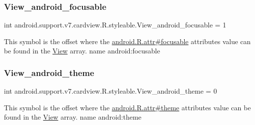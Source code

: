 \subsubsection{\texorpdfstring{View\+\_\+android\+\_\+focusable}{View\_android\_focusable}}
{\footnotesize\ttfamily int android.\+support.\+v7.\+cardview.\+R.\+styleable.\+View\+\_\+android\+\_\+focusable = 1\hspace{0.3cm}{\ttfamily [static]}}

This symbol is the offset where the \hyperlink{}{android.\+R.\+attr\#focusable} attribute\textquotesingle{}s value can be found in the \hyperlink{classandroid_1_1support_1_1v7_1_1cardview_1_1R_1_1styleable_a25c91e78e53c1aa0141b94584e88b486}{View} array.  name android\+:focusable \mbox{\label{classandroid_1_1support_1_1v7_1_1cardview_1_1R_1_1styleable_a977968b5162426b04e4c0f785248e889}} 
\subsubsection{\texorpdfstring{View\+\_\+android\+\_\+theme}{View\_android\_theme}}
{\footnotesize\ttfamily int android.\+support.\+v7.\+cardview.\+R.\+styleable.\+View\+\_\+android\+\_\+theme = 0\hspace{0.3cm}{\ttfamily [static]}}

This symbol is the offset where the \hyperlink{}{android.\+R.\+attr\#theme} attribute\textquotesingle{}s value can be found in the \hyperlink{classandroid_1_1support_1_1v7_1_1cardview_1_1R_1_1styleable_a25c91e78e53c1aa0141b94584e88b486}{View} array.  name android\+:theme \mbox{\label{classandroid_1_1support_1_1v7_1_1cardview_1_1R_1_1styleable_ac75d4392262bd8cc266e0e0f62558b0a}} 
